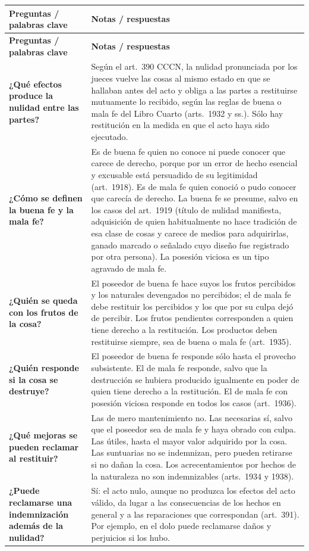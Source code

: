 \documentclass[12pt,oneside]{book}
\newcommand{\cornellhead}{%
    \toprule
    \textbf{Preguntas / palabras clave} & \textbf{Notas / respuestas} \\
    \midrule
}
\newcommand{\cornellrow}[2]{\textbf{#1} & #2 \\[1.3em]}
\begin{document}
\begin{longtable}{@{}QW@{}}
\cornellhead \endfirsthead
\cornellhead \endhead
\bottomrule \endfoot

\cornellrow{¿Qué efectos produce la nulidad entre las partes?}{Según el art.~390 CCCN, la nulidad pronunciada por los jueces vuelve las cosas al mismo estado en que se hallaban antes del acto y obliga a las partes a restituirse mutuamente lo recibido, según las reglas de buena o mala fe del Libro Cuarto (arts.~1932 y ss.). Sólo hay restitución en la medida en que el acto haya sido ejecutado.}

\cornellrow{¿Cómo se definen la buena fe y la mala fe?}{Es de buena fe quien no conoce ni puede conocer que carece de derecho, porque por un error de hecho esencial y excusable está persuadido de su legitimidad (art.~1918). Es de mala fe quien conoció o pudo conocer que carecía de derecho. La buena fe se presume, salvo en los casos del art.~1919 (título de nulidad manifiesta, adquisición de quien habitualmente no hace tradición de esa clase de cosas y carece de medios para adquirirlas, ganado marcado o señalado cuyo diseño fue registrado por otra persona). La posesión viciosa es un tipo agravado de mala fe.}

\cornellrow{¿Quién se queda con los frutos de la cosa?}{El poseedor de buena fe hace suyos los frutos percibidos y los naturales devengados no percibidos; el de mala fe debe restituir los percibidos y los que por su culpa dejó de percibir. Los frutos pendientes corresponden a quien tiene derecho a la restitución. Los productos deben restituirse siempre, sea de buena o mala fe (art.~1935).}

\cornellrow{¿Quién responde si la cosa se destruye?}{El poseedor de buena fe responde sólo hasta el provecho subsistente. El de mala fe responde, salvo que la destrucción se hubiera producido igualmente en poder de quien tiene derecho a la restitución. El de mala fe con posesión viciosa responde en todos los casos (art.~1936).}

\cornellrow{¿Qué mejoras se pueden reclamar al restituir?}{Las de mero mantenimiento no. Las necesarias sí, salvo que el poseedor sea de mala fe y haya obrado con culpa. Las útiles, hasta el mayor valor adquirido por la cosa. Las suntuarias no se indemnizan, pero pueden retirarse si no dañan la cosa. Los acrecentamientos por hechos de la naturaleza no son indemnizables (arts.~1934 y 1938).}

\cornellrow{¿Puede reclamarse una indemnización además de la nulidad?}{Sí: el acto nulo, aunque no produzca los efectos del acto válido, da lugar a las consecuencias de los hechos en general y a las reparaciones que correspondan (art.~391). Por ejemplo, en el dolo puede reclamarse daños y perjuicios si los hubo.}


\end{longtable}
\end{document}
